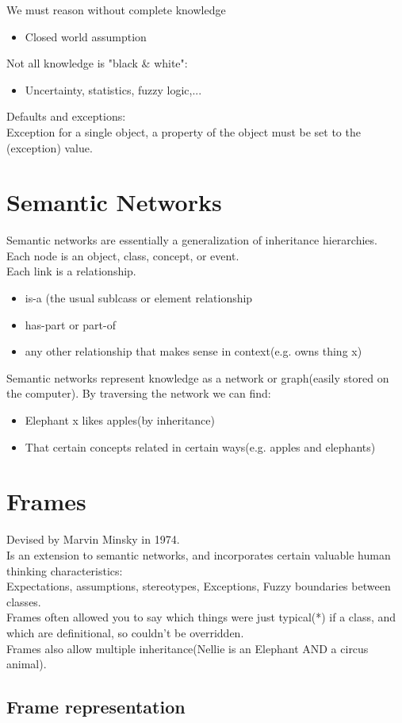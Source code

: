 We must reason without complete knowledge
\begin{itemize}
\item Closed world assumption
\end{itemize}

Not all knowledge is "black \& white":
\begin{itemize}
\item Uncertainty, statistics, fuzzy logic,...
\end{itemize}

Defaults and exceptions:\\
Exception for a single object, a property of the object must be set to the (exception) value.\\

\section{Semantic Networks}
Semantic networks are essentially a generalization of inheritance hierarchies.\\
Each node is an object, class, concept, or event. \\

Each link is a relationship.
\begin{itemize}
\item is-a (the usual sublcass or element relationship
\item has-part or part-of
\item any other relationship that makes sense in context(e.g. owns thing x)
\end{itemize}

Semantic networks represent knowledge as a network or graph(easily stored on the computer). 
By traversing the network we can find:
\begin{itemize}
\item Elephant x likes apples(by inheritance)
\item That certain concepts related in certain ways(e.g. apples and elephants)
\end{itemize}

\section{Frames}
Devised by Marvin Minsky in 1974.\\
Is an extension to semantic networks, and incorporates certain valuable human thinking characteristics:\\
Expectations, assumptions, stereotypes, Exceptions, Fuzzy boundaries between classes.\\

Frames often allowed you to say which things were just typical(*) if a class, and which are definitional, so couldn't be overridden.\\
Frames also allow multiple inheritance(Nellie is an Elephant AND a circus animal).\\

\subsection{Frame representation}






